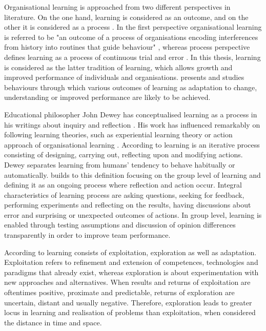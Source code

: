 Organisational learning is approached from two different perspectives in literature. On the one hand, learning is considered as an outcome, and on the other it is considered as a process \citep{edmondson1999psychological}. In the first perspective organisational learning is referred to be "an outcome of a process of organisations encoding interferences from history into routines that guide behaviour" \citep{levitt1988organizational}, whereas process perspective defines learning as a process of continuous trial and error \citep{argyris1978organizational}. In this thesis, learning is considered as the latter tradition of learning, which allows growth and improved performance of individuals and organisations. \citet{edmondson1999psychological} presents and studies behaviours through which various outcomes of learning as adaptation to change, understanding or improved performance are likely to be achieved. 

Educational philosopher John Dewey has conceptualised learning as a process in his writings about inquiry and reflection \citep{dewey1956human}. His work has influenced remarkably on following learning theories, such as experiential learning theory \citep{kolb1984experiential} or action approach of organisational learning \citep{schon1983reflective}. According to \citet{dewey1956human} learning is an iterative process consisting of designing, carrying out, reflecting upon and modifying actions. Dewey separates learning from humans' tendency to behave habitually or automatically. \citet{edmondson1999psychological} builds to this definition focusing on the group level of learning and defining it as an ongoing process where reflection and action occur. Integral characteristics of learning process are asking questions, seeking for feedback, performing experiments and reflecting on the results, having discussions about error and surprising or unexpected outcomes of actions. In group level, learning is enabled through testing assumptions and discussion of opinion differences transparently in order to improve team performance. \citep{edmondson1999psychological} 

According to \citet{march1991exploration} learning consists of exploitation, exploration as well as adaptation. Exploitation refers to refinement and extension of competences, technologies and paradigms that already exist, whereas exploration is about experimentation with new approaches and alternatives. When results and returns of exploitation are oftentimes positive, proximate and predictable, returns of exploration are uncertain, distant and usually negative. Therefore, exploration leads to greater locus in learning and realisation of problems than exploitation, when considered the distance in time and space. \citep{march1991exploration}

